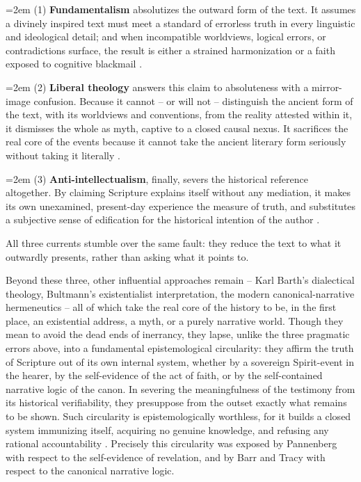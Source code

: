 \documentclass[11pt,a4paper]{article}
\newcommand{\subpar}[1]{%
  \begingroup
  \leftskip=2em %
  \noindent#1\par
  \endgroup
}
\begin{document}
\subpar{(1) \textbf{Fundamentalism} absolutizes the outward form of the text. It assumes a divinely inspired text must meet a standard of errorless truth in every linguistic and ideological detail; and when incompatible worldviews, logical errors, or contradictions surface, the result is either a strained harmonization or a faith exposed to cognitive blackmail \citep{barr1977}.}

\subpar{(2) \textbf{Liberal theology} answers this claim to absoluteness with a mirror-image confusion. Because it cannot -- or will not -- distinguish the ancient form of the text, with its worldviews and conventions, from the reality attested within it, it dismisses the whole as myth, captive to a closed causal nexus. It sacrifices the real core of the events because it cannot take the ancient literary form seriously without taking it literally \citep{schlatter1905,machen1923}.}

\subpar{(3) \textbf{Anti-intellectualism}, finally, severs the historical reference altogether. By claiming Scripture explains itself without any mediation, it makes its own unexamined, present-day experience the measure of truth, and substitutes a subjective sense of edification for the historical intention of the author \citep{noll1994}.}

All three currents stumble over the same fault: they reduce the text to what it outwardly presents, rather than asking what it points to.

Beyond these three, other influential approaches remain -- Karl Barth's dialectical theology, Bultmann's existentialist interpretation, the modern canonical-narrative hermeneutics \citep{barth1922,bultmann1941,childs1979,frei1974} -- all of which take the real core of the history to be, in the first place, an existential address, a myth, or a purely narrative world. Though they mean to avoid the dead ends of inerrancy, they lapse, unlike the three pragmatic errors above, into a fundamental epistemological circularity: they affirm the truth of Scripture out of its own internal system, whether by a sovereign Spirit-event in the hearer, by the self-evidence of the act of faith, or by the self-contained narrative logic of the canon. In severing the meaningfulness of the testimony from its historical verifiability, they presuppose from the outset exactly what remains to be shown. Such circularity is epistemologically worthless, for it builds a closed system immunizing itself, acquiring no genuine knowledge, and refusing any rational accountability \citep{popper1963}. Precisely this circularity was exposed by Pannenberg \citeyearpar{pannenberg1961,pannenberg1973} with respect to the self-evidence of revelation, and by Barr \citeyearpar{barr1983} and Tracy \citeyearpar{tracy1981} with respect to the canonical narrative logic.
\end{document}
